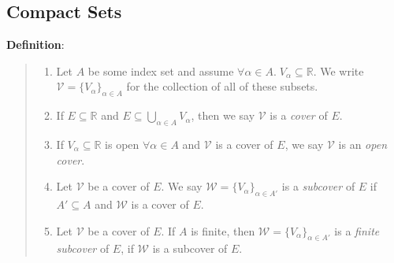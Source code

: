 \documentclass[11pt]{article}
\begin{document}
\subsection{Compact Sets}

\textbf{Definition}:
\begin{quote}\vspace{-0.3cm}
	\begin{enumerate}
	\item Let $A$ be some index set and assume $\forall \alpha \in A.\; V_\alpha \subseteq \mathbb{R}$. We write $\mathcal{V} = \{V_\alpha\}_{\alpha \in A}$ for the collection of all of these subsets.
	\item If $E \subseteq \mathbb{R}$ and $E \subseteq \bigcup_{\alpha \in A} V_\alpha$, then we say $\mathcal{V}$ is a \emph{cover} of $E$.
	\item If $V_\alpha \subseteq \mathbb{R}$ is open $\forall \alpha \in A$ and $\mathcal{V}$ is a cover of $E$, we say $\mathcal{V}$ is an \emph{open cover}.
	\item Let $\mathcal{V}$ be a cover of $E$. We say $\mathcal{W} = \{V_\alpha\}_{\alpha \in A'}$ is a \emph{subcover} of $E$ if $A' \subseteq A$ and $\mathcal{W}$ is a cover of $E$.
	\item Let $\mathcal{V}$ be a cover of $E$. If $A$ is finite, then $\mathcal{W} = \{V_\alpha\}_{\alpha \in A'}$ is a \emph{finite subcover} of $E$, if $\mathcal{W}$ is a subcover of $E$.
	\end{enumerate}
\end{quote}
\end{document}

